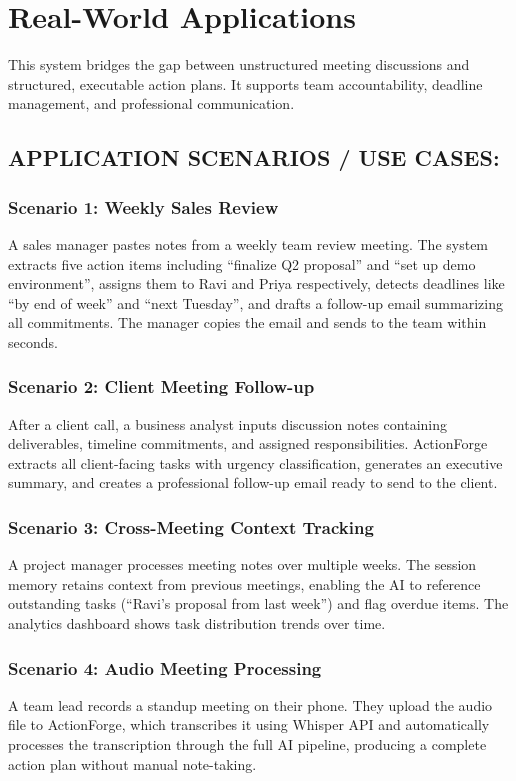 \documentclass[12pt,a4paper]{article}
\begin{document}
\section{Real-World Applications}

This system bridges the gap between unstructured meeting discussions and structured, executable action plans. It supports team accountability, deadline management, and professional communication.

\subsection*{APPLICATION SCENARIOS / USE CASES:}

\subsubsection{Scenario 1: Weekly Sales Review}
A sales manager pastes notes from a weekly team review meeting. The system extracts five action items including ``finalize Q2 proposal'' and ``set up demo environment'', assigns them to Ravi and Priya respectively, detects deadlines like ``by end of week'' and ``next Tuesday'', and drafts a follow-up email summarizing all commitments. The manager copies the email and sends to the team within seconds.

\subsubsection{Scenario 2: Client Meeting Follow-up}
After a client call, a business analyst inputs discussion notes containing deliverables, timeline commitments, and assigned responsibilities. ActionForge extracts all client-facing tasks with urgency classification, generates an executive summary, and creates a professional follow-up email ready to send to the client.

\subsubsection{Scenario 3: Cross-Meeting Context Tracking}
A project manager processes meeting notes over multiple weeks. The session memory retains context from previous meetings, enabling the AI to reference outstanding tasks (``Ravi's proposal from last week'') and flag overdue items. The analytics dashboard shows task distribution trends over time.

\subsubsection{Scenario 4: Audio Meeting Processing}
A team lead records a standup meeting on their phone. They upload the audio file to ActionForge, which transcribes it using Whisper API and automatically processes the transcription through the full AI pipeline, producing a complete action plan without manual note-taking.
\end{document}
